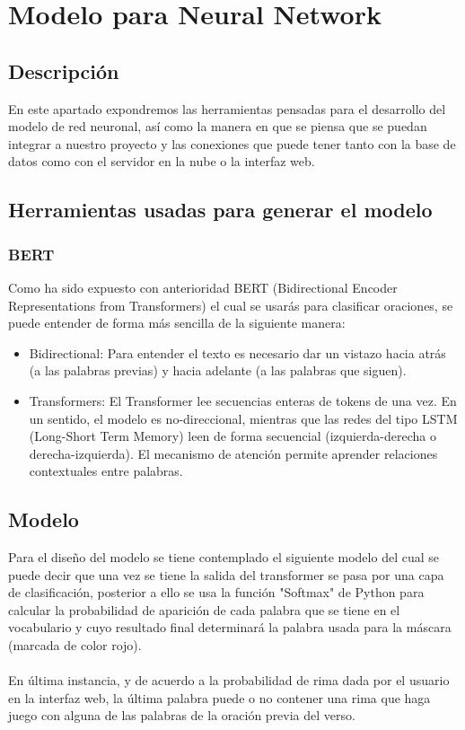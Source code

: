 \documentclass[12pt, a4paper, titlepage]{report}
\begin{document}
\section{Modelo para Neural Network} %
		\subsection{Descripción}
		En este apartado expondremos las herramientas pensadas para el desarrollo del modelo de red neuronal, así como la manera en que se piensa que se puedan integrar a nuestro proyecto y las conexiones que puede tener tanto con la base de datos como con el servidor en la nube o la interfaz web.
		\subsection{Herramientas usadas para generar el modelo} %
		\subsubsection*{BERT}
		Como ha sido expuesto con anterioridad BERT (Bidirectional Encoder Representations from Transformers) el cual se usarás para clasificar oraciones, se puede entender de forma más sencilla de la siguiente manera:
		\begin{itemize}
			\item Bidirectional: Para entender el texto es necesario dar un vistazo hacia atrás (a las palabras previas) y hacia adelante (a las palabras que siguen).
			\item Transformers: El Transformer lee secuencias enteras de tokens de una vez. En un sentido, el modelo es no-direccional, mientras que las redes del tipo LSTM (Long-Short Term Memory) leen de forma secuencial (izquierda-derecha o derecha-izquierda). El mecanismo de atención permite aprender relaciones contextuales entre palabras.
		\end{itemize}
		
		\subsection{Modelo} %
		
		Para el diseño del modelo se tiene contemplado el siguiente modelo del cual se puede decir que una vez se tiene la salida del transformer se pasa por una capa de clasificación, posterior a ello se usa la función "Softmax" de Python para calcular la probabilidad de aparición de cada palabra que se tiene en el vocabulario y cuyo resultado final determinará la palabra usada para la máscara (marcada de color rojo).
		\\\\
		En última instancia, y de acuerdo a la probabilidad de rima dada por el usuario en la interfaz web, la última palabra puede o no contener una rima que haga juego con alguna de las palabras de la oración previa del verso.
		
\end{document}
